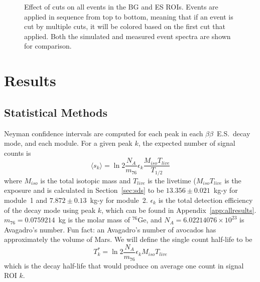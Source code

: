 \documentclass[notitlepage,rmp,aps,10pt]{revtex4-1}
\newcommand{\bb}{${\beta \beta}$}
\newcommand{\tnbb}{${2 \nu \beta \beta}$}
\newcommand{\bbes}{\bb~E.S.}
\newcommand{\iso}[2]{$^{#1}$#2}
\newcommand{\Ge}[1]{\iso{#1}{Ge}}
\newcommand{\Se}[1]{\iso{#1}{Se}}
\newcommand{\SP}[3]{$#1^{#2}_{#3}$}
\begin{document}
\begin{figure}
  \centering
  \caption{\label{fig:cutsroi}
    Effect of cuts on all events in the BG and ES ROIs. Events are applied in sequence from top to bottom, meaning that if an event is cut by multiple cuts, it will be colored based on the first cut that applied. Both the simulated and measured event spectra are shown for comparison.
  }
\end{figure}

\begin{table}
  \centering
  
  \caption[Detection efficiency summary for \tnbb\ to the \SP{0}{+}{1} state of \Se{76}]{\label{tab:bgcutstable}
    Table of detection efficiencies and uncertainties for \tnbb\ of \Ge{76} to the \SP{0}{+}{1} state of \Se{76}.
  }
\end{table}

\section{Results}


\subsection{Statistical Methods}
Neyman confidence intervals are computed for each peak in each \bbes\ decay mode, and each module.
For a given peak $k$, the expected number of signal counts is
\begin{equation}
  \langle s_k\rangle = \ln2 \frac{N_A}{m_{76}}\epsilon_k\frac{M_{iso}T_{live}}{T_{1/2}}
\end{equation}
where $M_{iso}$ is the total isotopic mass and $T_{live}$ is the livetime ($M_{iso}T_{live}$ is the exposure and is calculated in Section~\ref{sec:sds} to be $13.356\pm0.021$~kg-y for module~1 and $7.872\pm0.13$~kg-y for module~2.
$\epsilon_k$ is the total detection efficiency of the decay mode using peak $k$, which can be found in Appendix~\ref{app:allresults}.
$m_{76}=0.0759214$~kg is the molar mass of \Ge{76}, and $N_A=6.02214076\times10^{23}$ is Avagadro's number.
Fun fact: an Avagadro's number of avocados has approximately the volume of Mars.
We will define the single count half-life to be
\begin{equation}
  T^*_k=\ln2 \frac{N_A}{m_{76}}\epsilon_kM_{iso}T_{live}
\end{equation}
which is the decay half-life that would produce on average one count in signal ROI $k$.
\end{document}
